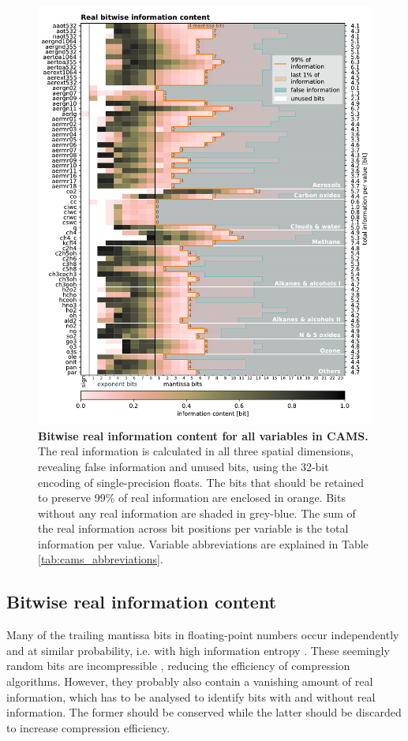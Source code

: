 \begin{figure}[tbhp]
	\includegraphics[width=1\textwidth]{Figures/compression/bitinformation.pdf}
	\caption{\textbf{Bitwise real information content for all variables in CAMS.} 
	The real information is calculated in all three spatial dimensions, revealing false information
	and unused bits, using the 32-bit encoding of single-precision floats. The bits that should be
	retained to preserve 99\% of real information are enclosed in orange. Bits without any real
	information are shaded in grey-blue. The sum of the real information across bit positions
	per variable is the total information per value. Variable abbreviations are explained in Table
	\ref{tab:cams_abbreviations}.}
	\label{fig:bitinformation}
\end{figure}

\subsection{Bitwise real information content}

Many of the trailing mantissa bits in floating-point numbers occur independently and at similar probability,
i.e. with high information entropy \citep{Kleeman2011,Jeffress2017}. These seemingly random bits are
incompressible \citep{MacKay2003a,Ziv1977,Huffman1952}, reducing
the efficiency of compression algorithms. However, they probably also contain a vanishing amount of real
information, which has to be analysed to identify bits with and without real information. The former should
be conserved while the latter should be discarded to increase compression efficiency.

